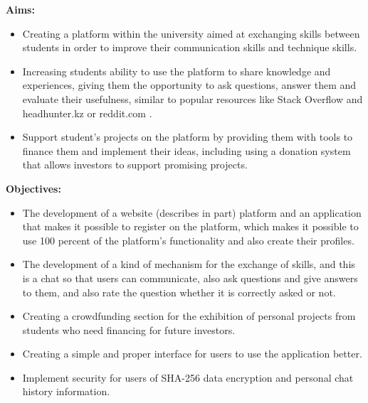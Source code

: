 \par
\flushleft
\textbf{Aims:}
\begin{itemize}
\justifying
  \item Creating a platform within the university aimed at exchanging skills between students in order to improve their communication skills and technique skills.
  \item Increasing students ability to use the platform to share knowledge and experiences, giving them the opportunity to ask questions, answer them and evaluate their usefulness, similar to popular resources like Stack Overflow \cite{stackoverlow} and headhunter.kz \cite{headhunter} or reddit.com \cite{reddit}.
  \item Support student’s projects on the platform by providing them with tools to finance them and implement their ideas, including using a donation system that allows investors to support promising projects.
\end{itemize}

\textbf{Objectives:}
\begin{itemize}
\justifying
  \item The development of a website (describes in  part) platform and an application  that makes it possible to register on the platform, which makes it possible to use 100 percent of the platform's functionality and also create their profiles.
  \item The development of a kind of mechanism for the exchange of skills, and this is a chat so that users can communicate, also ask questions and give answers to them, and also rate the question whether it is correctly asked or not.
  \item Creating a crowdfunding \cite{crowdfunding} section for the exhibition of personal projects from students who need financing for future investors.
  \item Creating a simple and proper interface for users to use the application better.
  \item Implement security for users of SHA-256 data encryption and personal chat history information.  
\end{itemize}

\newpage
